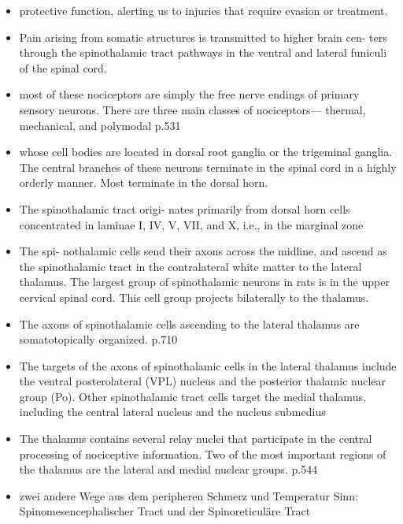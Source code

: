 \documentclass[12pt,a4paper,pdftex]{article}
\begin{document}
\begin{itemize}
    
    \begin{itemize}
        \item protective function, alerting us to injuries that require evasion or treatment. \cite{kandel2013principles}
        \item Pain arising from
        somatic structures is transmitted to higher brain cen-
        ters through the spinothalamic tract pathways in the
        ventral and lateral funiculi of the spinal cord. \cite{paxinos2014rat}
        \item most of these nociceptors
        are simply the free nerve endings of primary sensory
        neurons. There are three main classes of nociceptors—
        thermal, mechanical, and polymodal \cite{kandel2013principles} p.531
        \item whose cell bodies are located in dorsal root
        ganglia or the trigeminal ganglia. The central branches
        of these neurons terminate in the spinal cord in a highly
        orderly manner. Most terminate in the dorsal horn. \cite{kandel2013principles}
        \item The spinothalamic tract origi-
        nates primarily from dorsal horn cells concentrated in
        laminae I, IV, V, VII, and X, i.e., in the marginal zone \cite{paxinos2014rat}
        \item The spi-
        nothalamic cells send their axons across the midline, and
        ascend as the spinothalamic tract in the contralateral white matter to the lateral thalamus. The largest group of spinothalamic neurons in rats is in the upper cervical spinal cord. This cell group projects bilaterally to the thalamus. \cite{paxinos2014rat}
        \item The axons of spinothalamic cells ascending to the lateral thalamus are somatotopically organized. \cite{paxinos2014rat} p.710
        \item The targets of the axons of spinothalamic cells in the lateral thalamus include the ventral posterolateral (VPL) nucleus and the posterior thalamic nuclear group (Po). Other spinothalamic tract cells target the medial thalamus, including the central lateral nucleus and the nucleus submedius \cite{paxinos2014rat}
        \item The thalamus contains several relay nuclei that participate in the central processing of nociceptive information. Two of the most important regions of the thalamus are the lateral and medial nuclear groups. \cite{kandel2013principles} p.544
        \item zwei andere Wege aus dem peripheren Schmerz und Temperatur Sinn: Spinomesencephalischer Tract und der Spinoreticuläre Tract

\end{itemize}
\end{itemize}
\end{document}
